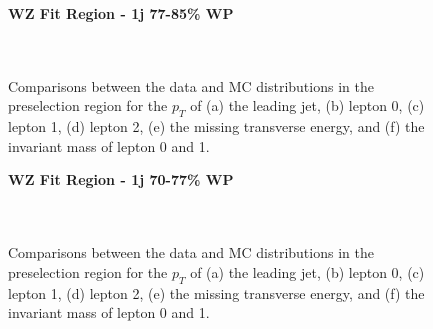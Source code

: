 \begin{figure}[H]
    \centering
    \textbf{WZ Fit Region - 1j 77-85\% WP}\\
    \\
    \\
    \caption{Comparisons between the data and MC distributions in the preselection region for the $p_T$ of (a) the leading jet, (b) lepton 0, (c) lepton 1, (d) lepton 2, (e) the missing transverse energy, and (f) the invariant mass of lepton 0 and 1.}
    \label{kin:WP_1j_77_85}
\end{figure}

\begin{figure}[H]
    \centering
    \textbf{WZ Fit Region - 1j 70-77\% WP}\\
    \\
    \\
    \caption{Comparisons between the data and MC distributions in the preselection region for the $p_T$ of (a) the leading jet, (b) lepton 0, (c) lepton 1, (d) lepton 2, (e) the missing transverse energy, and (f) the invariant mass of lepton 0 and 1.}
    \label{kin:WP_1j_70_77}   
\end{figure}

